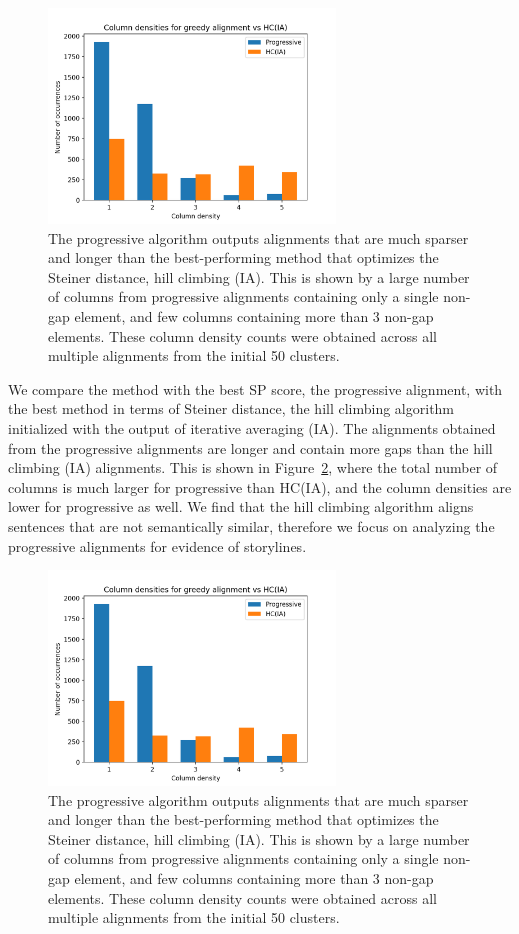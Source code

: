 \documentclass{article}
\begin{document}
\begin{figure}[h]
\centering
\includegraphics[width=3in]{img/prog125vhcia}
\caption{
\label{fig:colcounts}
The progressive algorithm outputs alignments that are much sparser
and longer than the best-performing method that optimizes the Steiner distance,
hill climbing (IA).
This is shown by a large number of columns from progressive alignments
containing only a single non-gap element,
and few columns containing more than 3 non-gap elements.
These column density counts were obtained across all multiple alignments from the
initial 50 clusters.
}
\end{figure}

We compare the method with the best SP score, the progressive alignment,
with the best method in terms of Steiner distance, the hill climbing algorithm
initialized with the output of iterative averaging (IA).
The alignments obtained from the progressive alignments are longer and contain more gaps
than the hill climbing (IA) alignments.
This is shown in Figure~\ref{fig:colcounts},
where the total number of columns is much larger for progressive than HC(IA),
and the column densities are lower for progressive as well.
We find that the hill climbing algorithm aligns sentences
that are not semantically similar,
therefore we focus on analyzing the progressive alignments for evidence of
storylines.

\begin{figure}[h]
\centering
\includegraphics[width=3in]{img/prog125vhcia.png}
\caption{
\label{fig:colcounts}
The progressive algorithm outputs alignments that are much sparser
and longer than the best-performing method that optimizes the Steiner distance,
hill climbing (IA).
This is shown by a large number of columns from progressive alignments
containing only a single non-gap element,
and few columns containing more than 3 non-gap elements.
These column density counts were obtained across all multiple alignments from the
initial 50 clusters.
}
\end{figure}
\end{document}
